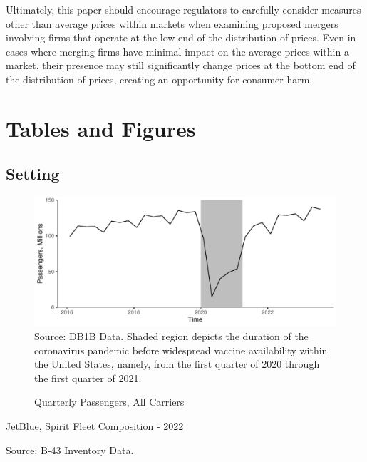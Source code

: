 \documentclass{article}
\begin{document}
    Ultimately, this paper should encourage regulators to carefully consider measures other than average prices within markets when examining proposed mergers involving firms that operate at the low end of the distribution of prices. Even in cases where merging firms have minimal impact on the average prices within a market, their presence may still significantly change prices at the bottom end of the distribution of prices, creating an opportunity for consumer harm. 
    
	
	\pagebreak 
	 
	
	\FloatBarrier
	
\pagebreak 
\FloatBarrier
\section{Tables and Figures}
\subsection{Setting}
\begin{figure}
	\caption{Quarterly Passengers, All Carriers}
	\label{fig:QuarterlyPass}
	\includegraphics[width = \linewidth]{Quarterly_DB1B_Itineraries}
	\footnotesize{Source: DB1B Data. Shaded region depicts the duration of the coronavirus pandemic before widespread vaccine availability within the United States, namely, from the first quarter of 2020 through the first quarter of 2021.}
\end{figure}

   \begin{table}[h]
      \begin{center}
             \caption{JetBlue, Spirit Fleet Composition - 2022}
            \label{tab:JetBlueSpirit_Fleet}
            \vspace{-10mm}
          
        \end{center}
        \footnotesize{Source: B-43 Inventory Data.}
    \end{table}
\end{document}
